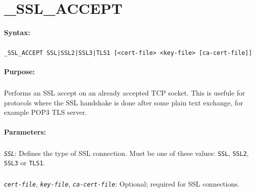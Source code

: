 
\newpage
\section{\_SSL\_ACCEPT}
\label{cmd:_SSL_ACCEPT}

\paragraph{Syntax:}
\subparagraph{}
\texttt{\_SSL\_ACCEPT SSL|SSL2|SSL3|TLS1 [<cert-file> <key-file> [ca-cert-file]]}

\paragraph{Purpose:}
\subparagraph{}
Performs an SSL accept on an already accepted TCP socket. This is usefule for protocols where
the SSL handshake is done after some plain text exchange, for example POP3 TLS server.

\paragraph{Parameters:}
\subparagraph{}
\textit{\texttt{SSL}}: Defines the type of SSL connection. Must be one of these values: 
\texttt{SSL}, \texttt{SSL2}, \texttt{SSL3} or \texttt{TLS1}.

\subparagraph{}
\textit{\texttt{cert-file}}, \textit{\texttt{key-file}}, \textit{\texttt{ca-cert-file}}: Optional; required 
for SSL connections. 


